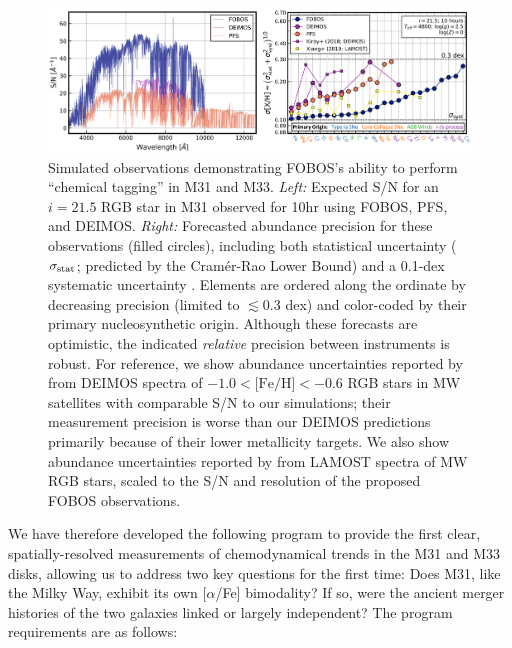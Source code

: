 \documentclass[11pt,a4paper,twoside,onecolumn,openany,final,oldfontcommands]{memoir}
\begin{document}
\begin{figure}
\includegraphics[width=1.0\textwidth]{figs/abundances_snr_v6.png}
\caption[Simulated M31 RGB spectra and abundance forecasts]{Simulated observations demonstrating FOBOS's ability to perform ``chemical tagging'' in M31 and M33. \textit{Left:} Expected S/N for an $i=21.5$ RGB star in M31 observed for 10hr using FOBOS, PFS, and DEIMOS. \textit{Right:}  Forecasted abundance precision for these observations (filled circles), including both statistical uncertainty ($\sigma_{\rm stat}$; predicted by the Cram\'er-Rao Lower Bound) and a 0.1-dex systematic uncertainty \citep[$\sigma_{\rm syst}$; cf.,][]{kirby18, xiang2019}. Elements are ordered along the ordinate by decreasing precision (limited to $\lesssim$0.3 dex) and color-coded by their primary nucleosynthetic origin. Although these forecasts are optimistic, the indicated \textit{relative} precision between instruments is robust. For reference, we show abundance uncertainties reported by \citet[][purple squares]{kirby18} from DEIMOS spectra of $-1.0<\text{[Fe/H]}<-0.6$ RGB stars in MW satellites with comparable S/N to our simulations; their measurement precision is worse than our DEIMOS predictions primarily because of their lower metallicity targets.  We also show abundance uncertainties reported by \citet[][yellow squares]{xiang2019} from LAMOST spectra of MW RGB stars, scaled to the S/N and resolution of the proposed FOBOS  observations.}
\label{fig:abundances_snr}
\end{figure}


We have therefore developed the following program to provide the first clear, spatially-resolved measurements of chemodynamical trends in the M31 and M33 disks, allowing us to address two key questions for the first time: Does M31, like the Milky Way, exhibit its own [$\alpha$/Fe] bimodality?  If so, were the ancient merger histories of the two galaxies linked or largely independent? The program requirements are as follows:
\end{document}
